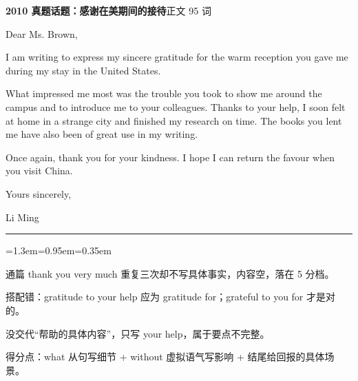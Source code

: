\documentclass[10pt,a4paper]{ctexart}
\begin{document}
\vspace{2pt}\noindent\colorbox{soft}{\parbox{\dimexpr\linewidth-2\fboxsep\relax}{%
\vspace{2pt}
{\footnotesize\bfseries\color{accent}2010 真题话题：感谢在美期间的接待}\hfill{\footnotesize\color{gray}正文 95 词}
\par\vspace{2pt}
\footnotesize Dear Ms. Brown,\par
\footnotesize I am writing to express my sincere gratitude for the warm reception you gave me during my stay in the United States.\par
\footnotesize What impressed me most was the trouble you took to show me around the campus and to introduce me to your colleagues. Thanks to your help, I soon felt at home in a strange city and finished my research on time. The books you lent me have also been of great use in my writing.\par
\footnotesize Once again, thank you for your kindness. I hope I can return the favour when you visit China.\par
\footnotesize Yours sincerely,\par
\footnotesize Li Ming\par
\par{}
\par\vspace{1pt}}}\par
\vspace{2pt}
\vspace{4pt}\par\nopagebreak
{\color{rule}\rule{\linewidth}{0.6pt}}\par\nopagebreak
\vspace{1pt}
\vspace{1pt}\begingroup\setlength{\parindent}{0pt}
\begin{list}{}{\leftmargin=1.3em=0.95em=0.35em\itemindent=0pt\topsep=0pt\partopsep=0pt\parsep=1.5pt\itemsep=0pt}
\item[{\color{warn}\scriptsize$\blacksquare$}]{\footnotesize 通篇 thank you very much 重复三次却不写具体事实，内容空，落在 5 分档。}
\item[{\color{warn}\scriptsize$\blacksquare$}]{\footnotesize 搭配错：gratitude to your help 应为 gratitude for；grateful to you for 才是对的。}
\item[{\color{warn}\scriptsize$\blacksquare$}]{\footnotesize 没交代“帮助的具体内容”，只写 your help，属于要点不完整。}
\item[{\color{warn}\scriptsize$\blacksquare$}]{\footnotesize 得分点：what 从句写细节 + without 虚拟语气写影响 + 结尾给回报的具体场景。}
\end{list}
\end{document}
